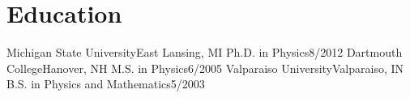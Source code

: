 \section{Education}
  \resumeSubHeadingListStart
    
    \resumeSubheading
      {Michigan State University}{East Lansing, MI}
      {Ph.D. in Physics}{8/2012}
    \resumeSubheading
      {Dartmouth College}{Hanover, NH}
      {M.S. in Physics}{6/2005}
    \resumeSubheading
      {Valparaiso University}{Valparaiso, IN}
      {B.S. in Physics and Mathematics}{5/2003}
      
      
  \resumeSubHeadingListEnd

